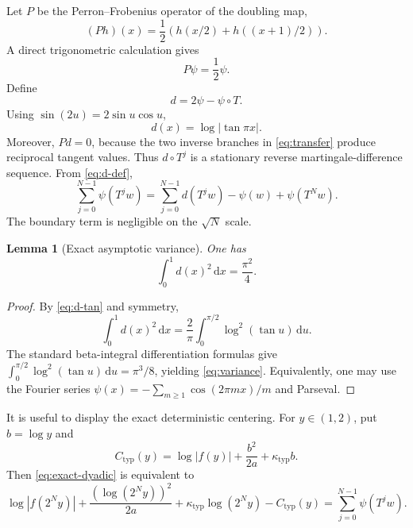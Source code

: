 \documentclass[11pt,oneside]{article}
\newtheorem{lemma}[theorem]{Lemma}
\theoremstyle{definition}
\theoremstyle{remark}
\newcommand{\dd}{\,\mathrm d}
\newcommand{\T}{T}
\begin{document}
Let $P$ be the Perron--Frobenius operator of the doubling map,
\begin{equation}
 (Ph)(x)=\frac12\left(h(x/2)+h((x+1)/2)\right).             \label{eq:transfer}
\end{equation}
A direct trigonometric calculation gives
\begin{equation}
 P\psi=\frac12\psi.                                        \label{eq:Ppsi}
\end{equation}
Define
\begin{equation}
 d=2\psi-\psi\circ\T.
 \label{eq:d-def}
\end{equation}
Using $\sin(2u)=2\sin u\cos u$,
\begin{equation}
 d(x)=\log|\tan\pi x|.                                     \label{eq:d-tan}
\end{equation}
Moreover, $Pd=0$, because the two inverse branches in \eqref{eq:transfer}
produce reciprocal tangent values.  Thus $d\circ\T^j$ is a stationary reverse
martingale-difference sequence.  From \eqref{eq:d-def},
\begin{equation}
 \sum_{j=0}^{N-1}\psi(\T^jw)
 =\sum_{j=0}^{N-1}d(\T^jw)-\psi(w)+\psi(\T^Nw).            \label{eq:martingale-coboundary}
\end{equation}
The boundary term is negligible on the $\sqrt N$ scale.

\begin{lemma}[Exact asymptotic variance]
One has
\begin{equation}
 \int_0^1d(x)^2\dd x=\frac{\pi^2}{4}.                      \label{eq:variance}
\end{equation}
\end{lemma}

\begin{proof}
By \eqref{eq:d-tan} and symmetry,
\[
 \int_0^1d(x)^2\dd x
 =\frac2\pi\int_0^{\pi/2}\log^2(\tan u)\dd u.
\]
The standard beta-integral differentiation formulas give
$\int_0^{\pi/2}\log^2(\tan u)\dd u=\pi^3/8$, yielding
\eqref{eq:variance}.  Equivalently, one may use the Fourier series
$\psi(x)=-\sum_{m\ge1}\cos(2\pi mx)/m$ and Parseval.
\end{proof}

It is useful to display the exact deterministic centering.  For
$y\in(1,2)$, put $b=\log y$ and
\begin{equation}
 C_{\mathrm{typ}}(y)
 =\log|f(y)|+\frac{b^2}{2a}+\kappa_{\mathrm{typ}}b.          \label{eq:Ctyp}
\end{equation}
Then \eqref{eq:exact-dyadic} is equivalent to
\begin{equation}
 \log|f(2^Ny)|
 +\frac{(\log(2^Ny))^2}{2a}
 +\kappa_{\mathrm{typ}}\log(2^Ny)
 -C_{\mathrm{typ}}(y)
 =\sum_{j=0}^{N-1}\psi(\T^jw).                            \label{eq:exact-centered}
\end{equation}
\end{document}
